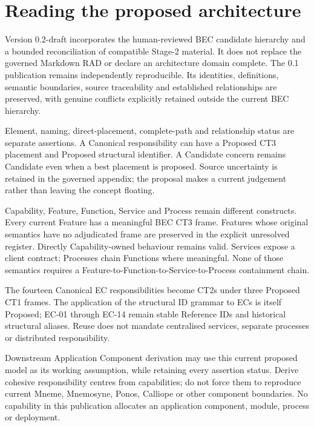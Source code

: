 \chapter{Reading the proposed architecture}\label{model:guide}\label{guide}
Version 0.2-draft incorporates the human-reviewed BEC candidate hierarchy and a bounded reconciliation of compatible Stage-2 material. It does not replace the governed Markdown RAD or declare an architecture domain complete. The 0.1 publication remains independently reproducible. Its identities, definitions, semantic boundaries, source traceability and established relationships are preserved, with genuine conflicts explicitly retained outside the current BEC hierarchy.

Element, naming, direct-placement, complete-path and relationship status are separate assertions. A Canonical responsibility can have a Proposed CT3 placement and Proposed structural identifier. A Candidate concern remains Candidate even when a best placement is proposed. Source uncertainty is retained in the governed appendix; the proposal makes a current judgement rather than leaving the concept floating.

Capability, Feature, Function, Service and Process remain different constructs. Every current Feature has a meaningful BEC CT3 frame. Features whose original semantics have no adjudicated frame are preserved in the explicit unresolved register. Directly Capability-owned behaviour remains valid. Services expose a client contract; Processes chain Functions where meaningful. None of those semantics requires a Feature-to-Function-to-Service-to-Process containment chain.

The fourteen Canonical EC responsibilities become CT2s under three Proposed CT1 frames. The application of the structural ID grammar to ECs is itself Proposed; EC-01 through EC-14 remain stable Reference IDs and historical structural aliases. Reuse does not mandate centralised services, separate processes or distributed responsibility.

Downstream Application Component derivation may use this current proposed model as its working assumption, while retaining every assertion status. Derive cohesive responsibility centres from capabilities; do not force them to reproduce current Mneme, Mnemosyne, Ponos, Calliope or other component boundaries. No capability in this publication allocates an application component, module, process or deployment.

